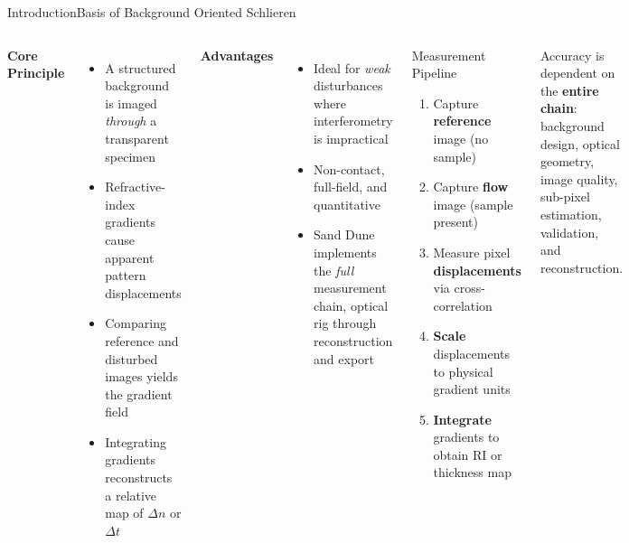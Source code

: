\documentclass[9pt, aspectratio=169]{beamer}
\begin{document}
\begin{frame}{Introduction}{Basis of Background Oriented Schlieren}
  \begin{columns}[t]
      \textbf{Core Principle}
      \begin{itemize}
        \item A structured background is imaged \emph{through} a transparent specimen
        \item Refractive-index gradients cause apparent pattern displacements
        \item Comparing reference and disturbed images yields the gradient field
        \item Integrating gradients reconstructs a relative map of $\Delta n$ or $\Delta t$
      \end{itemize}
      \vspace{0.4em}
      \textbf{Advantages}
      \begin{itemize}
        \item Ideal for \emph{weak} disturbances where interferometry is impractical
        \item Non-contact, full-field, and quantitative
        \item Sand Dune implements the \emph{full} measurement chain, optical rig through reconstruction and export
      \end{itemize}
      \vspace{-0.5cm}
      \begin{block}{Measurement Pipeline}
        \begin{enumerate}
          \small
          \item Capture \textbf{reference} image (no sample)
          \item Capture \textbf{flow} image (sample present)
          \item Measure pixel \textbf{displacements} via cross-correlation
          \item \textbf{Scale} displacements to physical gradient units
          \item \textbf{Integrate} gradients to obtain RI or thickness map
        \end{enumerate}
      \end{block}
      \vspace{0.3em}
      \small Accuracy is dependent on the \textbf{entire chain}: background design, optical geometry, image quality, sub-pixel estimation, validation, and reconstruction.
  \end{columns}
\end{frame}
\end{document}
